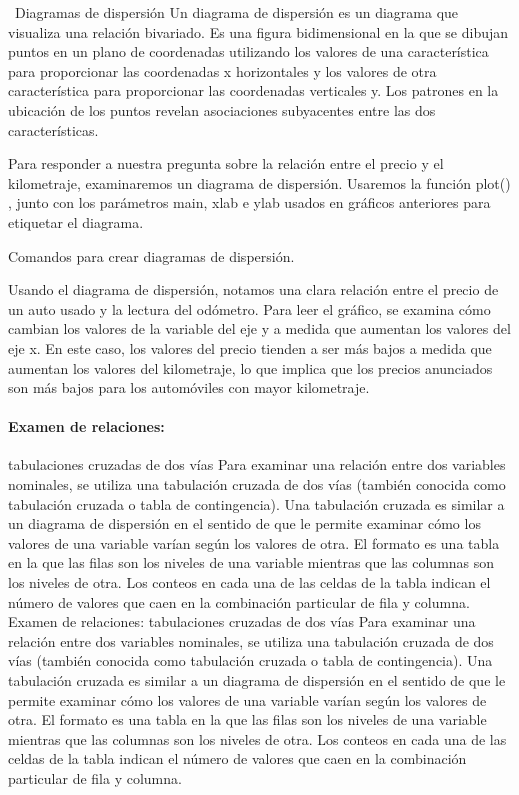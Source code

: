 \documentclass[
  letterpaper,
  DIV=11,
  numbers=noendperiod]{scrartcl}
\let\oldparagraph\paragraph
\renewcommand{\paragraph}[1]{\oldparagraph{#1}\mbox{}}
\begin{document}
~Diagramas de dispersión Un diagrama de dispersión es un diagrama que
visualiza una relación bivariado. Es una figura bidimensional en la que
se dibujan puntos en un plano de coordenadas utilizando los valores de
una característica para proporcionar las coordenadas x horizontales y
los valores de otra característica para proporcionar las coordenadas
verticales y. Los patrones en la ubicación de los puntos revelan
asociaciones subyacentes entre las dos características.

Para responder a nuestra pregunta sobre la relación entre el precio y el
kilometraje, examinaremos un diagrama de dispersión. Usaremos la función
plot() , junto con los parámetros main, xlab e ylab usados en gráficos
anteriores para etiquetar el diagrama.

Comandos para crear diagramas de dispersión.

Usando el diagrama de dispersión, notamos una clara relación entre el
precio de un auto usado y la lectura del odómetro. Para leer el gráfico,
se examina cómo cambian los valores de la variable del eje y a medida
que aumentan los valores del eje x. En este caso, los valores del precio
tienden a ser más bajos a medida que aumentan los valores del
kilometraje, lo que implica que los precios anunciados son más bajos
para los automóviles con mayor kilometraje.

\hypertarget{examen-de-relaciones}{%
\paragraph{\texorpdfstring{\textbf{Examen de
relaciones:}}{Examen de relaciones:}}\label{examen-de-relaciones}}

tabulaciones cruzadas de dos vías Para examinar una relación entre dos
variables nominales, se utiliza una tabulación cruzada de dos vías
(también conocida como tabulación cruzada o tabla de contingencia). Una
tabulación cruzada es similar a un diagrama de dispersión en el sentido
de que le permite examinar cómo los valores de una variable varían según
los valores de otra. El formato es una tabla en la que las filas son los
niveles de una variable mientras que las columnas son los niveles de
otra. Los conteos en cada una de las celdas de la tabla indican el
número de valores que caen en la combinación particular de fila y
columna. Examen de relaciones: tabulaciones cruzadas de dos vías Para
examinar una relación entre dos variables nominales, se utiliza una
tabulación cruzada de dos vías (también conocida como tabulación cruzada
o tabla de contingencia). Una tabulación cruzada es similar a un
diagrama de dispersión en el sentido de que le permite examinar cómo los
valores de una variable varían según los valores de otra. El formato es
una tabla en la que las filas son los niveles de una variable mientras
que las columnas son los niveles de otra. Los conteos en cada una de las
celdas de la tabla indican el número de valores que caen en la
combinación particular de fila y columna.
\end{document}
